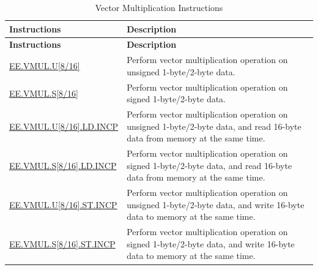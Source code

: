 \begin{longtable}[c]{|l|m{11cm}|}
    \caption{Vector Multiplication Instructions}
    \label{tab:pie-vmul-instructions}\\
    \hline
    \rowcolor{lightgray}
    \textbf{Instructions} & \textbf{Description} \\\hline
    \endfirsthead
    \rowcolor{lightgray}
    \textbf{Instructions} & \textbf{Description} \\\hline
    \endhead
    \endfoot
    
    \hyperref[instruction:EEVMULU8]{EE.VMUL.U[8/16]} & Perform vector multiplication operation on unsigned 1-byte/2-byte data.
    \\\hline
    \hyperref[instruction:EEVMULS8]{EE.VMUL.S[8/16]} & Perform vector multiplication operation on signed 1-byte/2-byte data.
    \\\hline
    \hyperref[instruction:EEVMULU8LDINCP]{EE.VMUL.U[8/16].LD.INCP} & Perform vector multiplication operation on unsigned 1-byte/2-byte data, and read 16-byte data from memory at the same time.
    \\\hline
    \hyperref[instruction:EEVMULS8LDINCP]{EE.VMUL.S[8/16].LD.INCP} & Perform vector multiplication operation on signed 1-byte/2-byte data, and read 16-byte data from memory at the same time.
    \\\hline
    \hyperref[instruction:EEVMULU8STINCP]{EE.VMUL.U[8/16].ST.INCP} & Perform vector multiplication operation on unsigned 1-byte/2-byte data, and write 16-byte data to memory at the same time.
    \\\hline
    \hyperref[instruction:EEVMULS8STINCP]{EE.VMUL.S[8/16].ST.INCP} & Perform vector multiplication operation on signed 1-byte/2-byte data, and write 16-byte data to memory at the same time.
    \\\hline
\end{longtable}